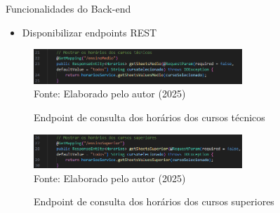 \begin{frame}{Funcionalidades do Back-end}
    \begin{itemize}
        \item Disponibilizar endpoints REST
    \end{itemize}
    \begin{figure}
        \centering
        \vspace{-0.3cm}
        \caption{Endpoint de consulta dos horários dos cursos técnicos}
        \vspace{-0.2cm}
        \includegraphics[width=0.7\textwidth]{figuras/back-3.png}
        \\ %
        \small Fonte: Elaborado pelo autor (2025)
    \end{figure}
    \begin{figure}
        \centering
        \vspace{-0.5cm}
        \caption{Endpoint de consulta dos horários dos cursos superiores}
        \vspace{-0.2cm}
        \includegraphics[width=0.7\textwidth]{figuras/back-4.png}
        \\ %
        \small Fonte: Elaborado pelo autor (2025)
    \end{figure}
\end{frame}

